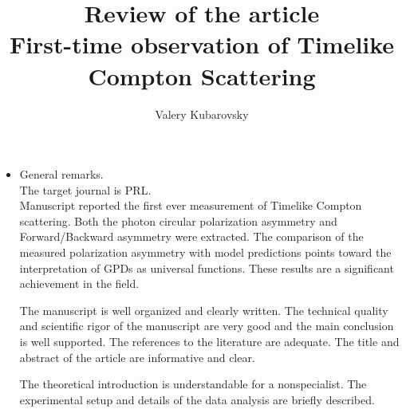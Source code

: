 \documentclass[11pt]{article}
\title{Review of the article\\
First-time observation of Timelike Compton Scattering}
\author{Valery Kubarovsky}
\date{}                                           %
\begin{document}
\maketitle
\begin{itemize}

\item General remarks.\\
The target journal is PRL. \\
Manuscript  reported the first ever
measurement of Timelike Compton scattering. Both
the photon circular polarization asymmetry and Forward/Backward asymmetry were extracted. 
The comparison of the measured polarization asymmetry with model predictions points toward the interpretation of GPDs as universal functions. 
These results are  a significant achievement in the field.

The manuscript is well organized and clearly written. 
The technical quality and scientific rigor of the manuscript are very good and the main conclusion is well supported. 
The references to the literature are adequate. 
The title and abstract of the article are informative and clear. 

The theoretical introduction is understandable  for a nonspecialist.
The experimental setup and details of the data analysis are briefly described. 




\end{itemize}
\end{document}
